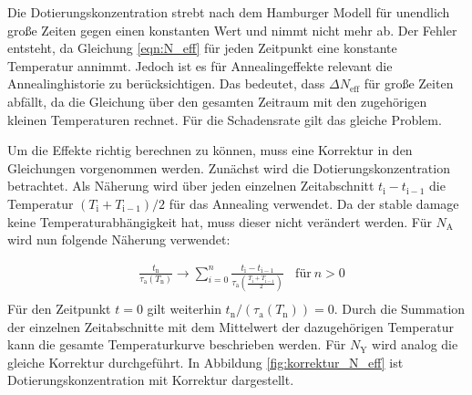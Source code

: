 
Die Dotierungskonzentration strebt nach dem Hamburger Modell
für unendlich große Zeiten gegen einen konstanten Wert und nimmt nicht mehr
ab.
Der Fehler entsteht, da Gleichung \ref{eqn:N_eff} für jeden
Zeitpunkt eine konstante Temperatur annimmt. Jedoch ist es für Annealingeffekte
relevant die Annealinghistorie zu berücksichtigen.
Das bedeutet, dass $\Delta N_{\mathrm{eff}}$ für große Zeiten abfällt, da die Gleichung über den
gesamten Zeitraum mit den zugehörigen kleinen Temperaturen rechnet. Für
die Schadensrate gilt das gleiche Problem.

Um die Effekte richtig berechnen zu können, muss eine Korrektur in den
Gleichungen vorgenommen werden.
Zunächst wird die Dotierungskonzentration betrachtet. Als Näherung wird über
jeden einzelnen Zeitabschnitt $t_{\mathrm{i}} - t_{\mathrm{i-1}}$ die
Temperatur $(T_{\mathrm{i}} +T_{\mathrm{i-1}})/2$ für das Annealing verwendet.
Da der stable damage keine Temperaturabhängigkeit hat, muss dieser nicht
verändert werden. Für $N_{\mathrm{A}}$ wird nun folgende Näherung
verwendet:

\begin{align}
  &\frac{t_{\mathrm{n}}}{\tau_{\mathrm{a}}(T_{\mathrm{n}})} \rightarrow \sum_{i=0}^n  \frac{t_{\mathrm{i}} - t_{\mathrm{i-1}}}{\tau_{\mathrm{a}}(\frac{T_{\mathrm{i}} +T_{\mathrm{i-1}}}{2})} \:\:\:\: \text{für} \: n>0 \\
\end{align}
Für den Zeitpunkt $t=0$ gilt weiterhin $t_{\mathrm{n}}/(\tau_{\mathrm{a}}(T_{\mathrm{n}})) = 0$.
Durch die Summation der einzelnen Zeitabschnitte mit dem Mittelwert der dazugehörigen
Temperatur kann die gesamte Temperaturkurve beschrieben werden. Für $N_{\mathrm{Y}}$
wird analog die gleiche Korrektur durchgeführt.
In Abbildung \ref{fig:korrektur_N_eff} ist Dotierungskonzentration mit Korrektur dargestellt.


